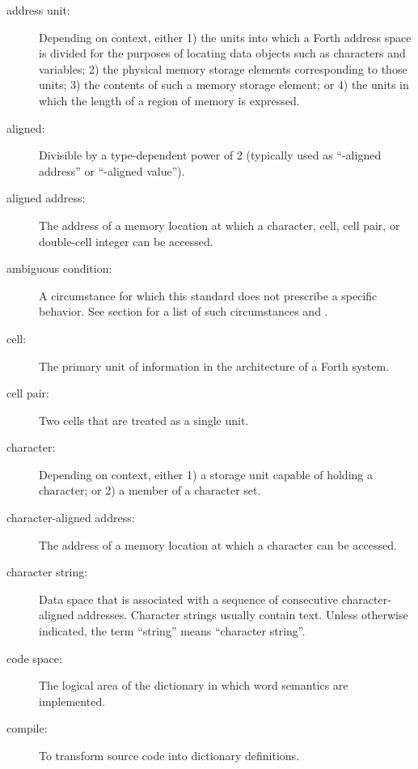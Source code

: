 \begin{description}
\item[address unit:]
Depending on context, either
1) the units into which a Forth address space is divided for the
	purposes of locating data objects such as characters and variables;
2) the physical memory storage elements corresponding to those units;
3) the contents of such a memory storage element; or
4) the units in which the length of a region of memory is expressed.

\item[aligned:]
	Divisible by a type-dependent power of 2 (typically used as
	``-aligned address'' or\linebreak
	``-aligned value'').

\item[aligned address:]
	The address of a memory location at which a character, cell, cell
	pair, or double-cell integer can be accessed.

\item[ambiguous condition:]
	A circumstance for which this standard does not prescribe a
	specific behavior.  See section 
	for a list of such circumstances and
	.

\item[cell:]
	The primary unit of information in the architecture of a Forth
	system.

\item[cell pair:]
	Two cells that are treated as a single unit.

\item[character:]
	Depending on context, either
	1) a storage unit capable of holding a character; or
	2) a member of a character set.

\item[character-aligned address:]
	The address of a memory location at which a character can be
	accessed.

\item[character string:]
	Data space that is associated with a sequence of consecutive
	character-aligned addresses. Character strings usually contain
	text. Unless otherwise indicated, the term ``string'' means
	``character string''.

\item[code space:]
	The logical area of the dictionary in which word semantics are
	implemented.

\item[compile:]
	To transform source code into dictionary definitions.


\end{description}
